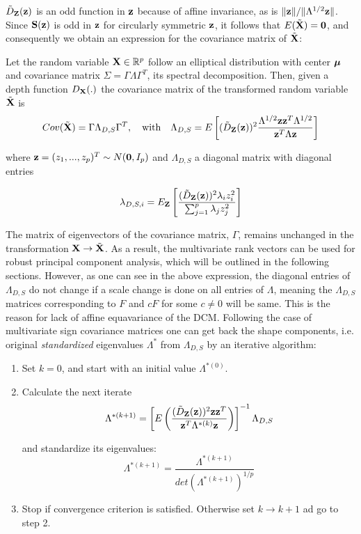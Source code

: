 \documentclass[fleqn,12pt]{article}
\begin{document}
$\tilde D_{\mathbf{Z}}({\bf{z}})$ is an odd function in ${\bf{z}}$ because of affine invariance, as is $\| {\bf{z}} \| / \|\Lambda^{1/2} {\bf{z}} \|$. Since ${\mathbf{S}}({\bf{z}})$ is odd in ${\bf{z}}$ for circularly symmetric ${\bf{z}}$, it follows that $E(\tilde {{\mathbf{X}}}) = \bf0$, and consequently we obtain an expression for the covariance matrix of $\tilde {{\mathbf{X}}}$:

\begin{Theorem} \label{Theorem:covform}
Let the random variable ${\mathbf{X}} \in \mathbb{R}^p$ follow an elliptical distribution with center ${\boldsymbol{\mu}}$ and covariance matrix $\Sigma = \Gamma\Lambda\Gamma^T$, its spectral decomposition. Then, given a depth function $D_{\mathbf{X}}(.)$ the covariance matrix of the transformed random variable $\tilde{{\mathbf{X}}}$ is
\begin{equation} \label{equation:covformEq1}
Cov(\tilde {{\mathbf{X}}}) = \Gamma \Lambda_{D,S} \Gamma^T,\quad\mbox{with}\quad \Lambda_{D,S} = E \left[ (\tilde D_{\mathbf{Z}}({\bf{z}}))^2 \frac{\Lambda^{1/2} {\bf{z}} {\bf{z}}^T \Lambda^{1/2}}{{\bf{z}}^T \Lambda {\bf{z}}} \right]
\end{equation}

where ${\bf{z}} = (z_1,...,z_p)^T \sim N({\bf 0}, I_p)$ and $\Lambda_{D,S}$ a diagonal matrix with diagonal entries

$$ \lambda_{D,S,i} = E_{\mathbf{Z}} \left[ \frac{(\tilde D_{\mathbf{Z}}({\bf{z}}))^2 \lambda_i z_i^2}{\sum_{j=1}^p \lambda_j z_j^2} \right] $$
\end{Theorem}

The matrix of eigenvectors of the covariance matrix, $\Gamma$, remains unchanged in the transformation ${\mathbf{X}} \rightarrow \tilde {{\mathbf{X}}}$. As a result, the multivariate rank vectors can be used for robust principal component analysis, which will be outlined in the following sections. However, as one can see in the above expression, the diagonal entries of $\Lambda_{D,S}$ do not change if a scale change is done on all entries of $\Lambda$, meaning the $\Lambda_{D,S}$ matrices corresponding to $F$ and $cF$ for some $c \neq 0$ will be same. This is the reason for lack of affine equavariance of the DCM. Following the case of multivariate sign covariance matrices \citep{taskinen12} one can get back the shape components, i.e. original \textit{standardized} eigenvalues $\Lambda^*$ from $\Lambda_{D,S}$ by an iterative algorithm:

\begin{enumerate}
\item Set $k=0$, and start with an initial value $\Lambda^{*(0)}$.

\item Calculate the next iterate
$$ \Lambda^{*(k+1)} = \left[ E\left( \frac{(\tilde D_{\mathbf{Z}}({\bf{z}}))^2 {\bf{z}} {\bf{z}}^T}{{\bf{z}}^T \Lambda^{*(k)} {\bf{z}}} \right) \right]^{-1} \Lambda_{D,S} $$

and standardize its eigenvalues:
$$ \Lambda^{*(k+1)} = \frac{\Lambda^{*(k+1)}}{det(\Lambda^{*(k+1)})^{1/p}} $$

\item Stop if convergence criterion is satisfied. Otherwise set $k \rightarrow k+1$ ad go to step 2.
\end{enumerate}
\end{document}
